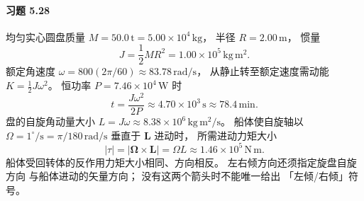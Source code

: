 \paragraph{习题 5.28}
均匀实心圆盘质量
\(M=50.0\,\mathrm t=5.00\times10^4\,\mathrm{kg}\)，
半径 \(R=2.00\,\mathrm m\)，
惯量
\[
 J=\frac12MR^2=1.00\times10^5\,\mathrm{kg\,m^2}.
\]
额定角速度
\(\omega=800(2\pi/60)\approx83.78\,\mathrm{rad/s}\)，
从静止转至额定速度需动能
\(K=\tfrac12J\omega^2\)。
恒功率 \(P=7.46\times10^4\,\mathrm W\) 时
\[
 \boxed{t=\frac{J\omega^2}{2P}
 \approx4.70\times10^3\,\mathrm s
 \approx78.4\,\mathrm{min}}.
\]
盘的自旋角动量大小
\(L=J\omega\approx8.38\times10^6\,\mathrm{kg\,m^2/s}\)。
船体使自旋轴以
\(\Omega=1^\circ/\mathrm s=\pi/180\,\mathrm{rad/s}\)
垂直于 \(\boldsymbol L\) 进动时，
所需进动力矩大小
\[
 \boxed{|\tau|=|\boldsymbol\Omega\times\boldsymbol L|
 =\Omega L\approx1.46\times10^5\,\mathrm{N\,m}}.
\]
船体受回转体的反作用力矩大小相同、方向相反。
左右倾方向还须指定旋盘自旋方向
与船体进动的矢量方向；
没有这两个箭头时不能唯一给出
「左倾/右倾」符号。
